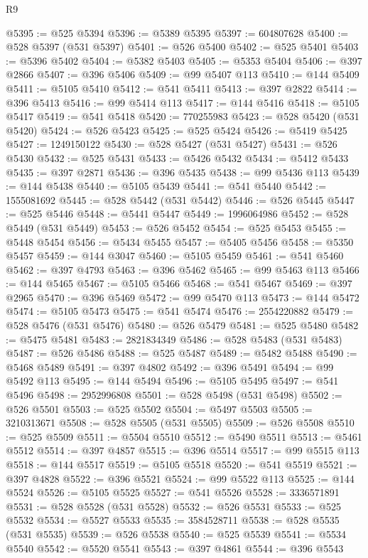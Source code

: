 \begin{lexlean}{R9}
\begin{coremodule}
{{{{{{{{{{{{{{{{{{{{{{{{{{{{{{{{{{{{{{{{{{{{{{{{{{{{{{{{{{{{{{{{{{{{{{{{{{{{{{{{{{{{@5395 := @525 @5394
@5396 := @5389 @5395
@5397 := 604807628
@5400 := @528 @5397 (@531 @5397)
@5401 := @526 @5400
@5402 := @525 @5401
@5403 := @5396 @5402
@5404 := @5382 @5403
@5405 := @5353 @5404
@5406 := @397 @2866
@5407 := @396 @5406
@5409 := @99 @5407 @113
@5410 := @144 @5409
@5411 := @5105 @5410
@5412 := @541 @5411
@5413 := @397 @2822
@5414 := @396 @5413
@5416 := @99 @5414 @113
@5417 := @144 @5416
@5418 := @5105 @5417
@5419 := @541 @5418
@5420 := 770255983
@5423 := @528 @5420 (@531 @5420)
@5424 := @526 @5423
@5425 := @525 @5424
@5426 := @5419 @5425
@5427 := 1249150122
@5430 := @528 @5427 (@531 @5427)
@5431 := @526 @5430
@5432 := @525 @5431
@5433 := @5426 @5432
@5434 := @5412 @5433
@5435 := @397 @2871
@5436 := @396 @5435
@5438 := @99 @5436 @113
@5439 := @144 @5438
@5440 := @5105 @5439
@5441 := @541 @5440
@5442 := 1555081692
@5445 := @528 @5442 (@531 @5442)
@5446 := @526 @5445
@5447 := @525 @5446
@5448 := @5441 @5447
@5449 := 1996064986
@5452 := @528 @5449 (@531 @5449)
@5453 := @526 @5452
@5454 := @525 @5453
@5455 := @5448 @5454
@5456 := @5434 @5455
@5457 := @5405 @5456
@5458 := @5350 @5457
@5459 := @144 @3047
@5460 := @5105 @5459
@5461 := @541 @5460
@5462 := @397 @4793
@5463 := @396 @5462
@5465 := @99 @5463 @113
@5466 := @144 @5465
@5467 := @5105 @5466
@5468 := @541 @5467
@5469 := @397 @2965
@5470 := @396 @5469
@5472 := @99 @5470 @113
@5473 := @144 @5472
@5474 := @5105 @5473
@5475 := @541 @5474
@5476 := 2554220882
@5479 := @528 @5476 (@531 @5476)
@5480 := @526 @5479
@5481 := @525 @5480
@5482 := @5475 @5481
@5483 := 2821834349
@5486 := @528 @5483 (@531 @5483)
@5487 := @526 @5486
@5488 := @525 @5487
@5489 := @5482 @5488
@5490 := @5468 @5489
@5491 := @397 @4802
@5492 := @396 @5491
@5494 := @99 @5492 @113
@5495 := @144 @5494
@5496 := @5105 @5495
@5497 := @541 @5496
@5498 := 2952996808
@5501 := @528 @5498 (@531 @5498)
@5502 := @526 @5501
@5503 := @525 @5502
@5504 := @5497 @5503
@5505 := 3210313671
@5508 := @528 @5505 (@531 @5505)
@5509 := @526 @5508
@5510 := @525 @5509
@5511 := @5504 @5510
@5512 := @5490 @5511
@5513 := @5461 @5512
@5514 := @397 @4857
@5515 := @396 @5514
@5517 := @99 @5515 @113
@5518 := @144 @5517
@5519 := @5105 @5518
@5520 := @541 @5519
@5521 := @397 @4828
@5522 := @396 @5521
@5524 := @99 @5522 @113
@5525 := @144 @5524
@5526 := @5105 @5525
@5527 := @541 @5526
@5528 := 3336571891
@5531 := @528 @5528 (@531 @5528)
@5532 := @526 @5531
@5533 := @525 @5532
@5534 := @5527 @5533
@5535 := 3584528711
@5538 := @528 @5535 (@531 @5535)
@5539 := @526 @5538
@5540 := @525 @5539
@5541 := @5534 @5540
@5542 := @5520 @5541
@5543 := @397 @4861
@5544 := @396 @5543
}}}}}}}}}}}}}}}}}}}}}}}}}}}}}}}}}}}}}}}}}}}}}}}}}}}}}}}}}}}}}}}}}}}}}}}}}}}}}}}}}}}}
\end{coremodule}
\end{lexlean}
